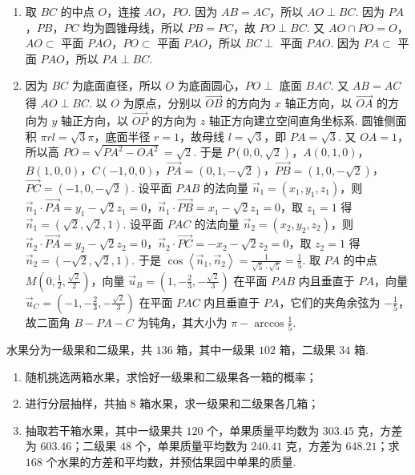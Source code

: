 \begin{solution}
\begin{enumerate}
\item 取 \(BC\) 的中点 \(O\)，连接 \(AO\)，\(PO\). 因为 \(AB=AC\)，所以 \(AO\perp BC\). 因为 \(PA\)，\(PB\)，\(PC\) 均为圆锥母线，所以 \(PB=PC\)，故 \(PO\perp BC\). 又 \(AO\cap PO=O\)，\(AO\subset\) 平面 \(PAO\)，\(PO\subset\) 平面 \(PAO\)，所以 \(BC\perp\) 平面 \(PAO\). 因为 \(PA\subset\) 平面 \(PAO\)，所以 \(PA\perp BC\).
\item 因为 \(BC\) 为底面直径，所以 \(O\) 为底面圆心，\(PO\perp\) 底面 \(BAC\). 又 \(AB=AC\) 得 \(AO\perp BC\). 以 \(O\) 为原点，分别以 \(\overrightarrow{OB}\) 的方向为 \(x\) 轴正方向，以 \(\overrightarrow{OA}\) 的方向为 \(y\) 轴正方向，以 \(\overrightarrow{OP}\) 的方向为 \(z\) 轴正方向建立空间直角坐标系. 圆锥侧面积 \(\pi rl=\sqrt3\pi\)，底面半径 \(r=1\)，故母线 \(l=\sqrt3\)，即 \(PA=\sqrt3\). 又 \(OA=1\)，所以高 \(PO=\sqrt{PA^2-OA^2}=\sqrt2\). 于是 \(P(0,0,\sqrt2)\)，\(A(0,1,0)\)，\(B(1,0,0)\)，\(C(-1,0,0)\)，\(\overrightarrow{PA}=(0,1,-\sqrt2)\)，\(\overrightarrow{PB}=(1,0,-\sqrt2)\)，\(\overrightarrow{PC}=(-1,0,-\sqrt2)\). 设平面 \(PAB\) 的法向量 \(\overrightarrow{n}_1=(x_1,y_1,z_1)\)，则 \(\overrightarrow{n}_1\cdot\overrightarrow{PA}=y_1-\sqrt2z_1=0\)，\(\overrightarrow{n}_1\cdot\overrightarrow{PB}=x_1-\sqrt2z_1=0\)，取 \(z_1=1\) 得 \(\overrightarrow{n}_1=(\sqrt2,\sqrt2,1)\). 设平面 \(PAC\) 的法向量 \(\overrightarrow{n}_2=(x_2,y_2,z_2)\)，则 \(\overrightarrow{n}_2\cdot\overrightarrow{PA}=y_2-\sqrt2z_2=0\)，\(\overrightarrow{n}_2\cdot\overrightarrow{PC}=-x_2-\sqrt2z_2=0\)，取 \(z_2=1\) 得 \(\overrightarrow{n}_2=(-\sqrt2,\sqrt2,1)\). 于是 \(\cos\left\langle\overrightarrow{n}_1,\overrightarrow{n}_2\right\rangle=\frac{1}{\sqrt5\cdot\sqrt5}=\frac15\). 取 \(PA\) 的中点 \(M\left(0,\frac12,\frac{\sqrt2}{2}\right)\)，向量 \(\overrightarrow{u}_B=\left(1,-\frac23,-\frac{\sqrt2}{3}\right)\) 在平面 \(PAB\) 内且垂直于 \(PA\)，向量 \(\overrightarrow{u}_C=\left(-1,-\frac23,-\frac{\sqrt2}{3}\right)\) 在平面 \(PAC\) 内且垂直于 \(PA\)，它们的夹角余弦为 \(-\frac15\)，故二面角 \(B-PA-C\) 为钝角，其大小为 \(\pi-\arccos\frac15\).
\end{enumerate}
\end{solution}

\begin{problem}
水果分为一级果和二级果，共 \(136\) 箱，其中一级果 \(102\) 箱，二级果 \(34\) 箱.

\begin{enumerate}
\item 随机挑选两箱水果，求恰好一级果和二级果各一箱的概率；
\item 进行分层抽样，共抽 \(8\) 箱水果，求一级果和二级果各几箱；
\item 抽取若干箱水果，其中一级果共 \(120\) 个，单果质量平均数为 \(303.45\) 克，方差为 \(603.46\)；二级果 \(48\) 个，单果质量平均数为 \(240.41\) 克，方差为 \(648.21\)；求 \(168\) 个水果的方差和平均数，并预估果园中单果的质量.
\end{enumerate}
\end{problem}

